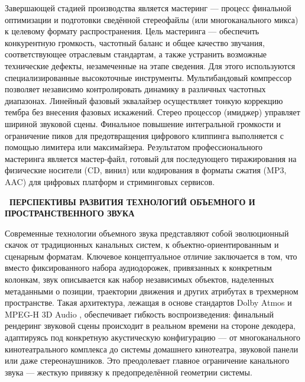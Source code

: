 \documentclass{SibFU-docs}
\begin{document}

Завершающей стадией производства является мастеринг — процесс финальной оптимизации и подготовки сведённой стереофайлы (или многоканального микса) к целевому формату распространения. Цель мастеринга — обеспечить конкурентную громкость, частотный баланс и общее качество звучания, соответствующее отраслевым стандартам, а также устранить возможные технические дефекты, незамеченные на этапе сведения. Для этого используются специализированные высокоточные инструменты. Мультибандовый компрессор позволяет независимо контролировать динамику в различных частотных диапазонах. Линейный фазовый эквалайзер осуществляет тонкую коррекцию тембра без внесения фазовых искажений. Стерео процессор (имиджер) управляет шириной звуковой сцены. Финальное повышение интегральной громкости и ограничение пиков для предотвращения цифрового клиппинга выполняется с помощью лимитера или максимайзера. Результатом профессионального мастеринга является мастер-файл, готовый для последующего тиражирования на физические носители (CD, винил) или кодирования в форматы сжатия (MP3, AAC) для цифровых платформ и стриминговых сервисов.

\newpage
{}
\begin{center}\textbf{\thesection\ ПЕРСПЕКТИВЫ РАЗВИТИЯ ТЕХНОЛОГИЙ ОБЪЕМНОГО И ПРОСТРАНСТВЕННОГО ЗВУКА}\end{center}
\vspace*{-1.5em}

Современные технологии объемного звука представляют собой эволюционный скачок от традиционных канальных систем, к объектно-ориентированным и сценарным форматам. Ключевое концептуальное отличие заключается в том, что вместо фиксированного набора аудиодорожек, привязанных к конкретным колонкам, звук описывается как набор независимых объектов, наделенных метаданными о позиции, траектории движения и других атрибутах в трехмерном пространстве. Такая архитектура, лежащая в основе стандартов Dolby Atmos и MPEG-H 3D Audio \cite{mpeg_immersive_audio}, обеспечивает гибкость воспроизведения: финальный рендеринг звуковой сцены происходит в реальном времени на стороне декодера, адаптируясь под конкретную акустическую конфигурацию — от многоканального кинотеатрального комплекса до системы домашнего кинотеатра, звуковой панели или даже стереонаушников. Это преодолевает главное ограничение канального звука — жесткую привязку к предопределённой геометрии системы.
\end{document}
